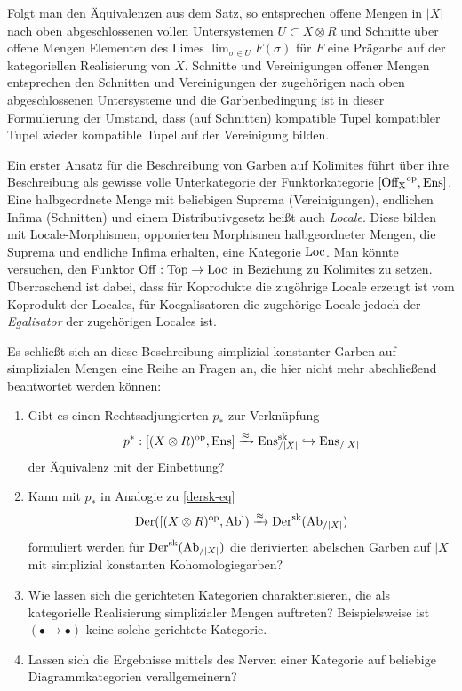 \begin{bem}
  Folgt man den Äquivalenzen aus dem Satz, so entsprechen offene
  Mengen in $|X|$ nach oben abgeschlossenen vollen Untersystemen $U
  \subset X \otimes R$ und Schnitte über offene Mengen Elementen des
  Limes $\lim_{\sigma \in U} F(\sigma)$ für $F$ eine Prägarbe auf der
  kategoriellen Realisierung von $X$. Schnitte und Vereinigungen
  offener Mengen entsprechen den Schnitten und Vereinigungen der
  zugehörigen nach oben abgeschlossenen Untersysteme und die
  Garbenbedingung ist in dieser Formulierung der Umstand, dass (auf
  Schnitten) kompatible Tupel kompatibler Tupel wieder kompatible
  Tupel auf der Vereinigung bilden.
\end{bem}
\begin{bem}
  Ein erster Ansatz für die Beschreibung von Garben auf Kolimites
  führt über ihre Beschreibung als gewisse volle Unterkategorie der
  Funktorkategorie $[\operatorname{Off_X}^\mathrm{op}, \operatorname{Ens}]$. Eine halbgeordnete Menge mit
  beliebigen Suprema (Vereinigungen), endlichen Infima (Schnitten) und
  einem Distributivgesetz heißt auch \emph{Locale}. Diese bilden mit
  Locale-Morphismen, opponierten Morphismen halbgeordneter Mengen, die
  Suprema und endliche Infima erhalten, eine Kategorie $\operatorname{Loc}$. Man
  könnte versuchen, den Funktor $\operatorname{Off}: \operatorname{Top} \to \operatorname{Loc}$ in Beziehung zu
  Kolimites zu setzen. Überraschend ist dabei, dass für Koprodukte die
  zugöhrige Locale erzeugt ist vom Koprodukt der Locales, für
  Koegalisatoren die zugehörige Locale jedoch der \emph{Egalisator}
  der zugehörigen Locales ist.
\end{bem}

Es schließt sich an diese Beschreibung simplizial konstanter Garben
auf simplizialen Mengen eine Reihe an Fragen an, die hier nicht mehr
abschließend beantwortet werden können:
\begin{enumerate}
\item Gibt es einen Rechtsadjungierten $p_*$ zur Verknüpfung
  \[p^*: [(X \otimes R)^\mathrm{op}, \operatorname{Ens}] \xrightarrow{\approx} \operatorname{Ens}^{\operatorname{sk}}_{/|X|} \hookrightarrow \operatorname{Ens}_{/|X|} \]
  der Äquivalenz mit der Einbettung?
\item Kann mit $p_*$ in Analogie zu \ref{dersk-eq}
  \[ \operatorname{Der}([(X \otimes R)^\mathrm{op}, \operatorname{Ab}]) \xrightarrow{\approx} \operatorname{Der}^{\operatorname{sk}}(\operatorname{Ab}_{/|X|}) \]
  formuliert werden für $\operatorname{Der}^{\operatorname{sk}}(\operatorname{Ab}_{/|X|})$ die derivierten
  abelschen Garben auf $|X|$ mit simplizial konstanten
  Kohomologiegarben?
\item Wie lassen sich die gerichteten Kategorien charakterisieren, die
  als kategorielle Realisierung simplizialer Mengen auftreten?
  Beispielsweise ist $(\bullet \to \bullet)$ keine solche gerichtete
  Kategorie.
\item Lassen sich die Ergebnisse mittels des Nerven einer Kategorie
  auf beliebige Diagrammkategorien verallgemeinern?
\end{enumerate}

